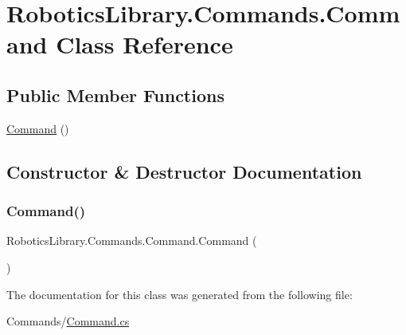 \hypertarget{class_robotics_library_1_1_commands_1_1_command}{}\section{Robotics\+Library.\+Commands.\+Command Class Reference}
\label{class_robotics_library_1_1_commands_1_1_command}
\subsection*{Public Member Functions}
\begin{DoxyCompactItemize}
\item 
\hyperlink{class_robotics_library_1_1_commands_1_1_command_a1bfb451ce5eb9f1bbb5aa2b6a934e302}{Command} ()
\end{DoxyCompactItemize}


\subsection{Constructor \& Destructor Documentation}
\mbox{\label{class_robotics_library_1_1_commands_1_1_command_a1bfb451ce5eb9f1bbb5aa2b6a934e302}} 
\subsubsection{\texorpdfstring{Command()}{Command()}}
{\footnotesize\ttfamily Robotics\+Library.\+Commands.\+Command.\+Command (\begin{DoxyParamCaption}{ }\end{DoxyParamCaption})}



The documentation for this class was generated from the following file\+:\begin{DoxyCompactItemize}
\item 
Commands/\hyperlink{_command_8cs}{Command.\+cs}\end{DoxyCompactItemize}
